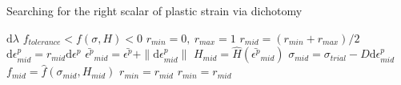 \documentclass{article}
\begin{document}
	\begin{algorithm}	
	\begin{algorithmic}[1]
		\caption{Searching for the right scalar of plastic strain via dichotomy}
		\Require $\mathrm{d}\lambda$
		\Ensure  $f_{tolerance} < f(\sigma, H) < 0$		
		\State $r_{min}=0,\  r_{max}=1$
		\State $r_{mid}=(r_{min}+r_{max})/2$
		\State $ \mathrm{d}\epsilon^p_{mid} = r_{mid} \mathrm{d}\epsilon^p$
		\State $\bar{\epsilon^{p}}_{mid} = \bar{\epsilon^{p}} + \| \mathrm{d}\epsilon^p_{mid} \|$
		\State $H_{mid} = \hat{H}(\bar{\epsilon^{p}}_{mid})$
		\State $\sigma_{mid}= \sigma_{trial} - D  \mathrm{d}\epsilon^p_{mid}$
		\State $f_{mid}=\hat{f}(\sigma_{mid}, H_{mid})$
		\State $r_{min} = r_{mid}$
		\Else
		 \State $r_{min} = r_{mid}$
		\EndIf
		\EndWhile
		\State {} 
	\end{algorithmic}
\end{algorithm}
\end{document}
